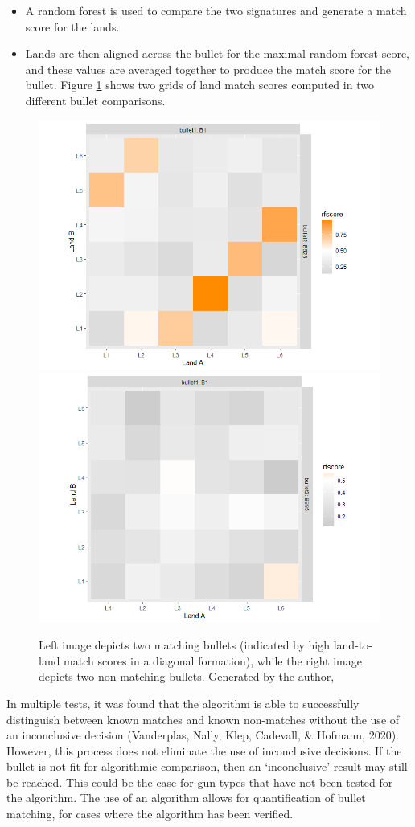 \documentclass[print]{nuthesis}
\begin{document}
\begin{itemize}
\item
  A random forest is used to compare the two signatures and generate a match score for the lands.
\item
  Lands are then aligned across the bullet for the maximal random forest score, and these values are averaged together to produce the match score for the bullet.
  Figure \ref{fig:gridcompare} shows two grids of land match scores computed in two different bullet comparisons.
\end{itemize}

\begin{figure}

{\centering \includegraphics[width=0.49\linewidth]{images/F526_Match_SingleGrid} \includegraphics[width=0.49\linewidth]{images/K995_NoMatch_SingleGrid} 

}

\caption{Left image depicts two matching bullets (indicated by high land-to-land match scores in a diagonal formation), while the right image depicts two non-matching bullets. Generated by the author,}\label{fig:gridcompare}
\end{figure}

In multiple tests, it was found that the algorithm is able to successfully distinguish between known matches and known non-matches without the use of an inconclusive decision (Vanderplas, Nally, Klep, Cadevall, \& Hofmann, 2020).
However, this process does not eliminate the use of inconclusive decisions.
If the bullet is not fit for algorithmic comparison, then an `inconclusive' result may still be reached.
This could be the case for gun types that have not been tested for the algorithm.
The use of an algorithm allows for quantification of bullet matching, for cases where the algorithm has been verified.
\end{document}

